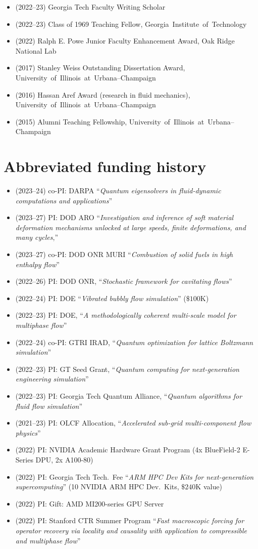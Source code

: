 \documentclass[10pt]{article}
\newcommand\GIT{\mbox{Georgia Institute of Technology}\xspace}
\newcommand\UIUC{\mbox{University of Illinois at Urbana--Champaign}\xspace}
\begin{document}
\begin{itemize}
    \item (2022--23) Georgia Tech Faculty Writing Scholar
    \item (2022--23) Class of 1969 Teaching Fellow, \GIT
    \item (2022) Ralph E. Powe Junior Faculty Enhancement Award, Oak Ridge National Lab
    \item (2017) Stanley Weiss Outstanding Dissertation Award, \UIUC
    \item (2016) Hassan Aref Award (research in fluid mechanics), \UIUC
    \item (2015) Alumni Teaching Fellowship, \UIUC
\end{itemize}

\section*{Abbreviated funding history}

\begin{itemize}
    \item (2023--24) co-PI: DARPA ``\textit{Quantum eigensolvers in fluid-dynamic computations and applications}''
    \item (2023--27) PI: DOD ARO ``\textit{Investigation and inference of soft material deformation mechanisms unlocked at large speeds, finite deformations, and many cycles},'' 
    \item (2023--27) co-PI: DOD ONR MURI ``\textit{Combustion of solid fuels in high enthalpy flow}'' 
    \item (2022--26) PI: DOD ONR, ``\textit{Stochastic framework for cavitating flows}''
    \item (2022--24) PI: DOE ``\textit{Vibrated bubbly flow simulation}'' ($\$100$K)
    \item (2022--23) PI: DOE, ``\textit{A methodologically coherent multi-scale model for multiphase flow}''
    \item (2022--24) co-PI: GTRI IRAD, ``\textit{Quantum optimization for lattice Boltzmann simulation}''
    \item (2022--23) PI: GT Seed Grant, ``\textit{Quantum computing for next-generation engineering simulation}''
    \item (2022--23) PI: Georgia Tech Quantum Alliance, ``\textit{Quantum algorithms for fluid flow simulation}''
    \item (2021--23) PI: OLCF Allocation, ``\textit{Accelerated sub-grid multi-component flow physics}'' 
    \item (2022) PI: NVIDIA Academic Hardware Grant Program (4x BlueField-2 E-Series DPU, 2x A100-80)
    \item (2022) PI: Georgia Tech Tech.\ Fee ``\textit{ARM HPC Dev Kits for next-generation supercomputing}'' (10 NVIDIA ARM HPC Dev.\ Kits, $\$240$K value)
    \item (2022) PI: Gift: AMD MI200-series GPU Server
    \item (2022) PI: Stanford CTR Summer Program ``\textit{Fast macroscopic forcing for operator recovery via locality and causality with application to compressible and multiphase flow}''
\end{itemize}
\end{document}
